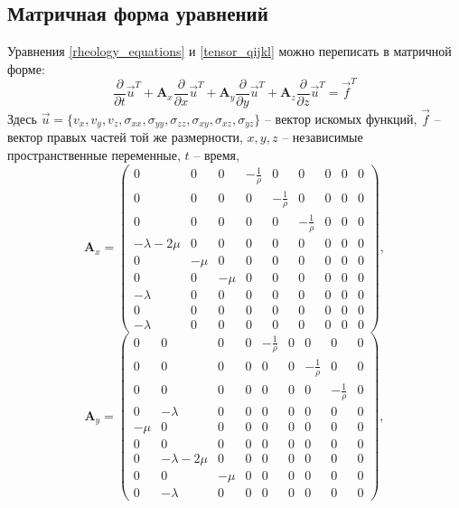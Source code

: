 \subsection{Матричная форма уравнений}
Уравнения \ref{rheology_equations} и \ref{tensor_qijkl} можно переписать в матричной
форме:
\begin{equation}
\label{matrix_equation}
\frac{\partial}{\partial{t}}\vec{u}^T+\mathbf{A}_x\frac{\partial}{\partial{x}}\vec{u}^T+
\mathbf{A}_y\frac{\partial}{\partial{y}}\vec{u}^T+
\mathbf{A}_z\frac{\partial}{\partial{z}}\vec{u}^T=\vec{f}^T
\end{equation}
Здесь
$\vec{u}=\{v_x,v_y,v_z,\sigma_{xx},\sigma_{yy},\sigma_{zz},\sigma_{xy},\sigma_{xz},\sigma_{yz}\}$
-- вектор искомых функций, $\vec{f}$ -- вектор правых частей той же размерности,
$x,y,z$ --  независимые пространственные переменные, $t$ -- время,
\begin{displaymath}
\mathbf{A}_x =
\left( \begin{array}{cccccccccccc}
0 & 0 & 0 & -\frac 1 \rho & 0 & 0 & 0 & 0 & 0 \\ 
0 & 0 & 0 & 0 & -\frac 1 \rho & 0 & 0 & 0 & 0 \\ 
0 & 0 & 0 & 0 & 0 & -\frac 1 \rho & 0 & 0 & 0 \\ 
-\lambda-2\mu & 0 & 0 & 0 & 0 & 0 & 0 & 0 & 0 \\ 
0 & -\mu & 0 & 0 & 0 & 0 & 0 & 0 & 0 \\ 
0 & 0 & -\mu & 0 & 0 & 0 & 0 & 0 & 0 \\ 
-\lambda & 0 & 0 & 0 & 0 & 0 & 0 & 0 & 0 \\ 
0 & 0 & 0 & 0 & 0 & 0 & 0 & 0 & 0 \\ 
-\lambda & 0 & 0 & 0 & 0 & 0 & 0 & 0 & 0  
\end{array} \right),
\end{displaymath} 
\begin{displaymath}
\mathbf{A}_y =
\left( \begin{array}{cccccccccccc}
0 & 0 & 0 & 0 & -\frac 1 \rho & 0 & 0 & 0 & 0 \\ 
0 & 0 & 0 & 0 & 0 & 0 & -\frac 1 \rho & 0 & 0 \\ 
0 & 0 & 0 & 0 & 0 & 0 & 0 & -\frac 1 \rho & 0 \\ 
0 & -\lambda & 0 & 0 & 0 & 0 & 0 & 0 & 0 \\ 
-\mu & 0 & 0 & 0 & 0 & 0 & 0 & 0 & 0 \\ 
0 & 0 & 0 & 0 & 0 & 0 & 0 & 0 & 0 \\ 
0 & -\lambda-2\mu & 0 & 0 & 0 & 0 & 0 & 0 & 0 \\ 
0 & 0 & -\mu & 0 & 0 & 0 & 0 & 0 & 0 \\ 
0 & -\lambda & 0 & 0 & 0 & 0 & 0 & 0 & 0  
\end{array} \right),
\end{displaymath}
